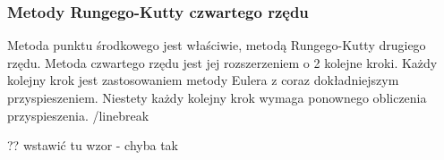 

\subsubsection {Metody Rungego-Kutty czwartego rzędu}

Metoda punktu środkowego jest właściwie, metodą Rungego-Kutty drugiego rzędu. Metoda czwartego rzędu jest jej rozszerzeniem o 2 kolejne kroki. Każdy kolejny krok jest zastosowaniem metody Eulera z coraz dokładniejszym przyspieszeniem. Niestety każdy kolejny krok wymaga ponownego obliczenia przyspieszenia. /linebreak

?? wstawić tu wzor - chyba tak

